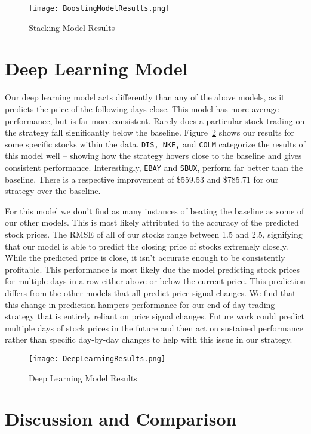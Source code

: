 \documentclass[../thesis.tex]{subfiles}
\begin{document}
\begin{figure}[h]
\centering
\texttt{[image: BoostingModelResults.png]}
\caption{Stacking Model Results \label{overflow}}
\label{stackingresults}
\end{figure}

\section{Deep Learning Model}
Our deep learning model acts differently than any of the above models, as it predicts the price of the following days close. This model has more average performance, but is far more consistent. Rarely does a particular stock trading on the strategy fall significantly below the baseline. Figure~\ref{deepresults} shows our results for some specific stocks within the data. \texttt{DIS, NKE,} and \texttt{COLM} categorize the results of this model well -- showing how the strategy hovers close to the baseline and gives consistent performance. Interestingly, \texttt{EBAY} and \texttt{SBUX}, perform far better than the baseline. There is a respective improvement of \$559.53 and \$785.71 for our strategy over the baseline. 


For this model we don't find as many instances of beating the baseline as some of our other models. This is most likely attributed to the accuracy of the predicted stock prices. The RMSE of all of our stocks range between 1.5 and 2.5, signifying that our model is able to predict the closing price of stocks extremely closely. While the predicted price is close, it isn't accurate enough to be consistently profitable. This performance is most likely due the model predicting stock prices for multiple days in a row either above or below the current price. This prediction differs from the other models that all predict price signal changes. We find that this change in prediction hampers performance for our end-of-day trading strategy that is entirely reliant on price signal changes. Future work could predict multiple days of stock prices in the future and then act on sustained performance rather than specific day-by-day changes to help with this issue in our strategy. 

\begin{figure}[h]
\centering
\texttt{[image: DeepLearningResults.png]}
\caption{Deep Learning Model Results \label{overflow}}
\label{deepresults}
\end{figure}

\section{Discussion and Comparison}
\end{document}

